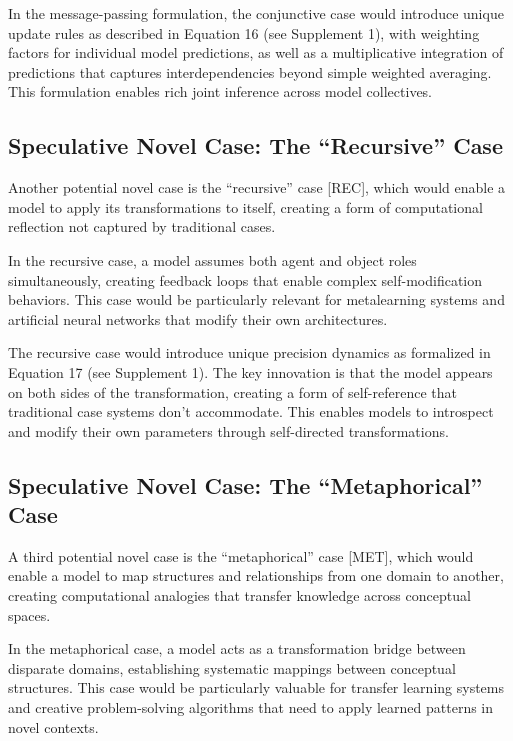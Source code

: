 \documentclass[
  11pt,
  letterpaper,
]{article}
\begin{document}
In the message-passing formulation, the conjunctive case would introduce
unique update rules as described in Equation 16 (see Supplement 1), with
weighting factors for individual model predictions, as well as a
multiplicative integration of predictions that captures
interdependencies beyond simple weighted averaging. This formulation
enables rich joint inference across model collectives.

\hypertarget{speculative-novel-case-the-recursive-case}{%
\subsection{Speculative Novel Case: The ``Recursive''
Case}\label{speculative-novel-case-the-recursive-case}}

Another potential novel case is the ``recursive'' case {[}REC{]}, which
would enable a model to apply its transformations to itself, creating a
form of computational reflection not captured by traditional cases.

In the recursive case, a model assumes both agent and object roles
simultaneously, creating feedback loops that enable complex
self-modification behaviors. This case would be particularly relevant
for metalearning systems and artificial neural networks that modify
their own architectures.

The recursive case would introduce unique precision dynamics as
formalized in Equation 17 (see Supplement 1). The key innovation is that
the model appears on both sides of the transformation, creating a form
of self-reference that traditional case systems don't accommodate. This
enables models to introspect and modify their own parameters through
self-directed transformations.

\hypertarget{speculative-novel-case-the-metaphorical-case}{%
\subsection{Speculative Novel Case: The ``Metaphorical''
Case}\label{speculative-novel-case-the-metaphorical-case}}

A third potential novel case is the ``metaphorical'' case {[}MET{]},
which would enable a model to map structures and relationships from one
domain to another, creating computational analogies that transfer
knowledge across conceptual spaces.

In the metaphorical case, a model acts as a transformation bridge
between disparate domains, establishing systematic mappings between
conceptual structures. This case would be particularly valuable for
transfer learning systems and creative problem-solving algorithms that
need to apply learned patterns in novel contexts.
\end{document}
